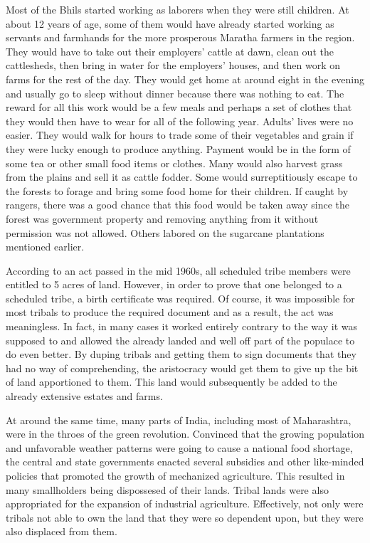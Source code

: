 \documentclass[report.tex]{subfiles}
\begin{document}
Most of the Bhils started working as laborers when they were still children. At about 12 years of age, some of them would have already started working as servants and farmhands for the more prosperous Maratha farmers in the region. They would have to take out their employers' cattle at dawn, clean out the cattlesheds, then bring in water for the employers' houses, and then work on farms for the rest of the day. They would get home at around eight in the evening and usually go to sleep without dinner because there was nothing to eat. The reward for all this work would be a few meals and perhaps a set of clothes that they would then have to wear for all of the following year. Adults' lives were no easier. They would walk for hours to trade some of their vegetables and grain if they were lucky enough to produce anything. Payment would be in the form of some tea or other small food items or clothes. Many would also harvest grass from the plains and sell it as cattle fodder. Some would surreptitiously escape to the forests to forage and bring some food home for their children. If caught by rangers, there was a good chance that this food would be taken away since the forest was government property and removing anything from it without permission was not allowed. Others labored on the sugarcane plantations mentioned earlier.

According to an act passed in the mid 1960s, all scheduled tribe members were entitled to 5 acres of land. However, in order to prove that one belonged to a scheduled tribe, a birth certificate was required. Of course, it was impossible for most tribals to produce the required document and as a result, the act was meaningless. In fact, in many cases it worked entirely contrary to the way it was supposed to and allowed the already landed and well off part of the populace to do even better. By duping tribals and getting them to sign documents that they had no way of comprehending, the aristocracy would get them to give up the bit of land apportioned to them. This land would subsequently be added to the already extensive estates and farms.

At around the same time, many parts of India, including most of Maharashtra, were in the throes of the green revolution. Convinced that the growing population and unfavorable weather patterns were going to cause a national food shortage, the central and state governments enacted several subsidies and other like-minded policies that promoted the growth of mechanized agriculture. This resulted in many smallholders being dispossesed of their lands. Tribal lands were also appropriated for the expansion of industrial agriculture. Effectively, not only were tribals not able to own the land that they were so dependent upon, but they were also displaced from them.
\end{document}
